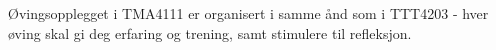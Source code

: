 Øvingsopplegget i TMA4111 er organisert i samme ånd som i TTT4203 - hver øving skal gi deg erfaring og trening, 
samt stimulere til refleksjon. 